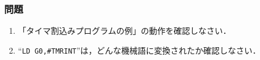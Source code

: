 \vfill
\subsubsection{問題}
\begin{enumerate}
\item 「タイマ割込みプログラムの例」の動作を確認しなさい．
\item ``{\tt LD G0,\#TMRINT}''は，どんな機械語に変換されたか確認しなさい．
\end{enumerate}
\vfill

%
%
%
